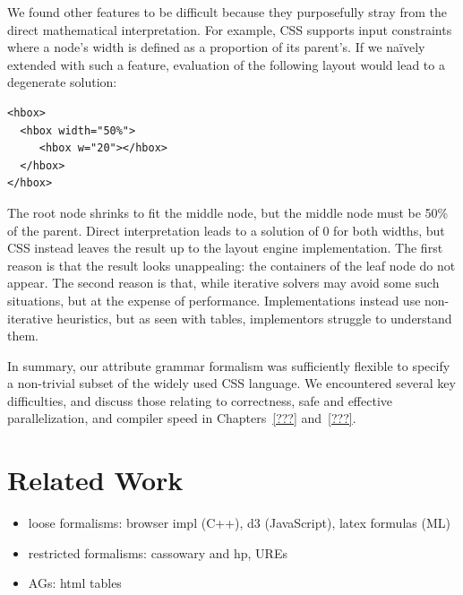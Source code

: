 We found other features to be difficult because they purposefully stray from the direct mathematical interpretation. For example, CSS supports input constraints where a node's width is defined as a proportion of its parent's. If we na\"{i}vely extended \hlang with such a feature, evaluation of the following layout would lead to a degenerate solution:
\begin{lstlisting}
<hbox>
  <hbox width="50%">
     <hbox w="20"></hbox>
  </hbox>
</hbox>
\end{lstlisting}
The root node shrinks to fit the middle node, but the middle node must be 50\% of the parent. Direct interpretation leads to a solution of 0 for both widths, but CSS instead leaves the result up to the layout engine implementation. The first reason is that the result looks unappealing: the containers of the leaf node do not appear. The second reason is that, while iterative solvers may avoid some such situations, but at the expense of performance. Implementations instead use non-iterative heuristics, but as seen with tables, implementors struggle to understand them.

In summary, our attribute grammar formalism was sufficiently flexible to specify a non-trivial subset of the widely used CSS language. We encountered several key difficulties, and discuss those relating to correctness, safe and effective parallelization, and compiler speed in Chapters~\ref{???} and~\ref{???}.


\section{Related Work}
\begin{itemize}
\item loose formalisms: browser impl (C++), d3 (JavaScript), latex formulas (ML)
\item restricted formalisms: cassowary and hp, UREs
\item AGs: html tables
\end{itemize}



